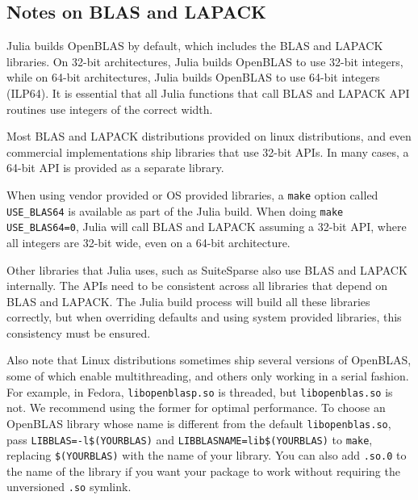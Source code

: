 \hypertarget{12663593244703205925}{}


\subsection{Notes on BLAS and LAPACK}



Julia builds OpenBLAS by default, which includes the BLAS and LAPACK libraries. On 32-bit architectures, Julia builds OpenBLAS to use 32-bit integers, while on 64-bit architectures, Julia builds OpenBLAS to use 64-bit integers (ILP64). It is essential that all Julia functions that call BLAS and LAPACK API routines use integers of the correct width.



Most BLAS and LAPACK distributions provided on linux distributions, and even commercial implementations ship libraries that use 32-bit APIs. In many cases, a 64-bit API is provided as a separate library.



When using vendor provided or OS provided libraries, a \texttt{make} option called \texttt{USE\_BLAS64} is available as part of the Julia build. When doing \texttt{make USE\_BLAS64=0}, Julia will call BLAS and LAPACK assuming a 32-bit API, where all integers are 32-bit wide, even on a 64-bit architecture.



Other libraries that Julia uses, such as SuiteSparse also use BLAS and LAPACK internally. The APIs need to be consistent across all libraries that depend on BLAS and LAPACK. The Julia build process will build all these libraries correctly, but when overriding defaults and using system provided libraries, this consistency must be ensured.



Also note that Linux distributions sometimes ship several versions of OpenBLAS, some of which enable multithreading, and others only working in a serial fashion. For example, in Fedora, \texttt{libopenblasp.so} is threaded, but \texttt{libopenblas.so} is not. We recommend using the former for optimal performance. To choose an OpenBLAS library whose name is different from the default \texttt{libopenblas.so}, pass \texttt{LIBBLAS=-l\$(YOURBLAS)} and \texttt{LIBBLASNAME=lib\$(YOURBLAS)} to \texttt{make}, replacing \texttt{\$(YOURBLAS)} with the name of your library. You can also add \texttt{.so.0} to the name of the library if you want your package to work without requiring the unversioned \texttt{.so} symlink.



